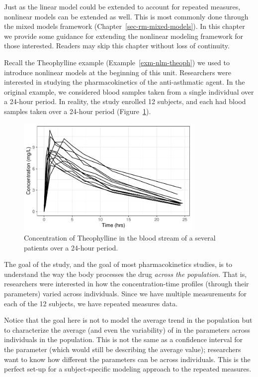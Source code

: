 \documentclass[
  letterpaper,
  DIV=11,
  numbers=noendperiod]{scrreprt}
\theoremstyle{definition}
\theoremstyle{definition}
\theoremstyle{remark}
\begin{document}
Just as the linear model could be extended to account for repeated
measures, nonlinear models can be extended as well. This is most
commonly done through the mixed models framework
(Chapter~\ref{sec-rm-mixed-models}). In this chapter we provide some
guidance for extending the nonlinear modeling framework for those
interested. Readers may skip this chapter without loss of continuity.

Recall the Theophylline example (Example~\ref{exm-nlm-theoph}) we used
to introduce nonlinear models at the beginning of this unit. Researchers
were interested in studying the pharmacokinetics of the anti-asthmatic
agent. In the original example, we considered blood samples taken from a
single individual over a 24-hour period. In reality, the study enrolled
12 subjects, and each had blood samples taken over a 24-hour period
(Figure~\ref{fig-nlm-rm-plot}).

\begin{figure}

{\centering \includegraphics[width=0.8\textwidth,height=\textheight]{./images/fig-nlm-rm-plot-1.pdf}

}

\caption{\label{fig-nlm-rm-plot}Concentration of Theophylline in the
blood stream of a several patients over a 24-hour period.}

\end{figure}

The goal of the study, and the goal of most pharmacokinetics studies, is
to understand the way the body processes the drug \emph{across the
population}. That is, researchers were interested in how the
concentration-time profiles (through their parameters) varied across
individuals. Since we have multiple measurements for each of the 12
subjects, we have repeated measures data.

Notice that the goal here is not to model the average trend in the
population but to characterize the average (and even the variability) of
in the parameters across individuals in the population. This is not the
same as a confidence interval for the parameter (which would still be
describing the average value); researchers want to know how different
the parameters can be across individuals. This is the perfect set-up for
a subject-specific modeling approach to the repeated measures.
\end{document}
